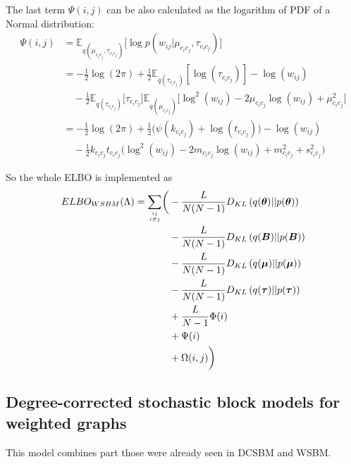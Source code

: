 \documentclass{article}
\renewcommand{\v}[1]{\bm{#1}}
\newcommand{\E}{\mathbb{E}}
\begin{document}
The last term $\Psi(i,j)$ can be also calculated as the logarithm of PDF of a Normal distribution:
\begin{equation}
\begin{split}
\Psi(i,j) &= \E_{q(\mu_{c_ic_j},\tau_{c_ic_j})}\biggl[ \log p(w_{ij} | \mu_{c_ic_j}, \tau_{c_ic_j}) \biggr] \\
&= - \frac{1}{2} \log (2\pi) + \frac{1}{2} \E_{q(\tau_{c_ic_j})}[\log(\tau_{c_ic_j})] - \log(w_{ij}) \\
& \quad - \frac{1}{2} \E_{q(\tau_{c_ic_j})}\bigl[\tau_{c_ic_j}\bigr] \E_{q(\mu_{c_ic_j})}\bigl[\log^2(w_{ij}) -2 \mu_{c_ic_j} \log(w_{ij}) + \mu_{c_ic_j}^2 \bigr]\\
&= - \frac{1}{2} \log (2\pi) + \frac{1}{2}\biggl( \psi(k_{c_ic_j}) + \log (t_{c_ic_j})\biggr) - \log(w_{ij}) \\
& \quad - \frac{1}{2} k_{c_ic_j} t_{c_ic_j} \biggl(\log^2(w_{ij}) -2 m_{c_ic_j} \log(w_{ij}) + m_{c_ic_j}^2 + s_{c_ic_j}^2 \biggr)
\end{split}
\end{equation}

So the whole ELBO is implemented as
\begin{equation}
\begin{split}
ELBO_{WSBM}(\Lambda) = \sum_{ij \atop i \neq j} \biggl( &- \frac{L}{N (N - 1)} D_{KL} \left(q(\v{\theta})||p(\v{\theta})\right)\\
\quad &- \frac{L}{N (N - 1)} D_{KL}\left(q(\v{B})||p(\v{B})\right) \\
\quad &- \frac{L}{N (N - 1)} D_{KL}\left(q(\v{\mu})||p(\v{\mu})\right) \\
\quad &- \frac{L}{N (N - 1)} D_{KL}\left(q(\v{\tau})||p(\v{\tau})\right) \\
\quad &+ \frac{L}{N - 1}\Phi(i)\\
\quad &+ \Psi(i)\\
\quad &+ \Omega(i,j)   \biggr)
\end{split}
\end{equation} 

\subsection{Degree-corrected stochastic block models for weighted graphs}
This model combines part those were already seen in DCSBM and WSBM.\\
\end{document}
